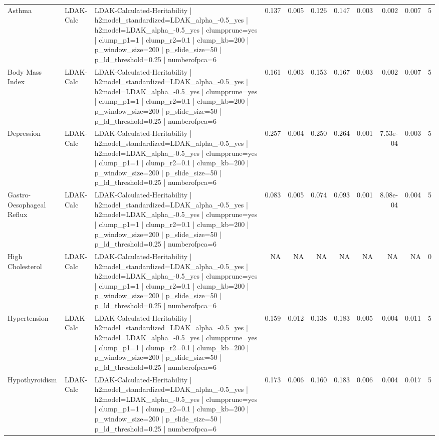 \begin{landscape}
\begin{longtable}{p{2.4cm}p{1.8cm}p{6.0cm}rrrrrrrr}
Asthma & LDAK-Calc & LDAK-Calculated-Heritability | h2model\_standardized=LDAK\_alpha\_-0.5\_yes | h2model=LDAK\_alpha\_-0.5\_yes | clumpprune=yes | clump\_p1=1 | clump\_r2=0.1 | clump\_kb=200 | p\_window\_size=200 | p\_slide\_size=50 | p\_ld\_threshold=0.25 | numberofpca=6 & 0.137 & 0.005 & 0.126 & 0.147 & 0.003 & 0.002 & 0.007 & 5 \\
Body Mass Index & LDAK-Calc & LDAK-Calculated-Heritability | h2model\_standardized=LDAK\_alpha\_-0.5\_yes | h2model=LDAK\_alpha\_-0.5\_yes | clumpprune=yes | clump\_p1=1 | clump\_r2=0.1 | clump\_kb=200 | p\_window\_size=200 | p\_slide\_size=50 | p\_ld\_threshold=0.25 | numberofpca=6 & 0.161 & 0.003 & 0.153 & 0.167 & 0.003 & 0.002 & 0.007 & 5 \\
Depression & LDAK-Calc & LDAK-Calculated-Heritability | h2model\_standardized=LDAK\_alpha\_-0.5\_yes | h2model=LDAK\_alpha\_-0.5\_yes | clumpprune=yes | clump\_p1=1 | clump\_r2=0.1 | clump\_kb=200 | p\_window\_size=200 | p\_slide\_size=50 | p\_ld\_threshold=0.25 | numberofpca=6 & 0.257 & 0.004 & 0.250 & 0.264 & 0.001 & 7.53e-04 & 0.003 & 5 \\
Gastro-Oesophageal Reflux & LDAK-Calc & LDAK-Calculated-Heritability | h2model\_standardized=LDAK\_alpha\_-0.5\_yes | h2model=LDAK\_alpha\_-0.5\_yes | clumpprune=yes | clump\_p1=1 | clump\_r2=0.1 | clump\_kb=200 | p\_window\_size=200 | p\_slide\_size=50 | p\_ld\_threshold=0.25 | numberofpca=6 & 0.083 & 0.005 & 0.074 & 0.093 & 0.001 & 8.08e-04 & 0.004 & 5 \\
High Cholesterol & LDAK-Calc & LDAK-Calculated-Heritability | h2model\_standardized=LDAK\_alpha\_-0.5\_yes | h2model=LDAK\_alpha\_-0.5\_yes | clumpprune=yes | clump\_p1=1 | clump\_r2=0.1 | clump\_kb=200 | p\_window\_size=200 | p\_slide\_size=50 | p\_ld\_threshold=0.25 | numberofpca=6 & NA & NA & NA & NA & NA & NA & NA & 0 \\
Hypertension & LDAK-Calc & LDAK-Calculated-Heritability | h2model\_standardized=LDAK\_alpha\_-0.5\_yes | h2model=LDAK\_alpha\_-0.5\_yes | clumpprune=yes | clump\_p1=1 | clump\_r2=0.1 | clump\_kb=200 | p\_window\_size=200 | p\_slide\_size=50 | p\_ld\_threshold=0.25 | numberofpca=6 & 0.159 & 0.012 & 0.138 & 0.183 & 0.005 & 0.004 & 0.011 & 5 \\
Hypothyroidism & LDAK-Calc & LDAK-Calculated-Heritability | h2model\_standardized=LDAK\_alpha\_-0.5\_yes | h2model=LDAK\_alpha\_-0.5\_yes | clumpprune=yes | clump\_p1=1 | clump\_r2=0.1 | clump\_kb=200 | p\_window\_size=200 | p\_slide\_size=50 | p\_ld\_threshold=0.25 | numberofpca=6 & 0.173 & 0.006 & 0.160 & 0.183 & 0.006 & 0.004 & 0.017 & 5 \\

\end{longtable}
\end{landscape}
